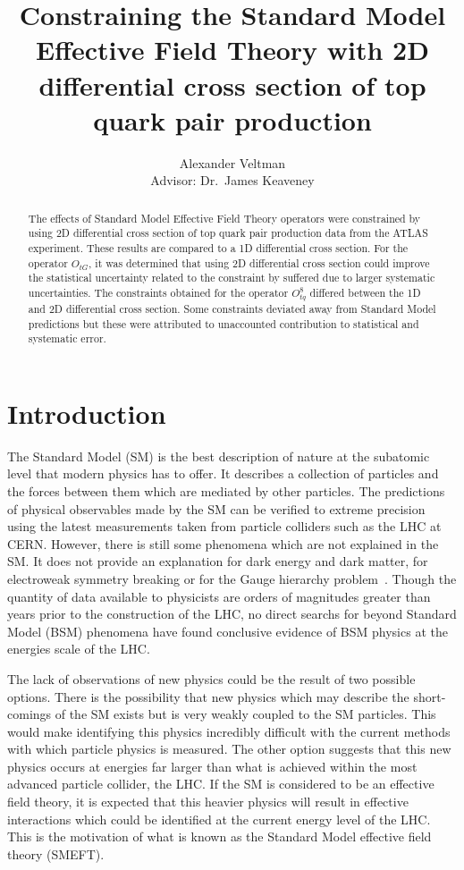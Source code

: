 \documentclass[a4paper,11pt]{article}
\title{Constraining the Standard Model Effective Field Theory with 2D differential cross section of top quark pair production}
\author{Alexander Veltman\\{\small Advisor: Dr.\ James Keaveney}}
\affil{Department of Physics,\\University of Cape Town}
\begin{document}
\maketitle

\begin{abstract}
    The effects of Standard Model Effective Field Theory operators were constrained by using 2D differential cross section of top quark pair production data from the ATLAS experiment.
    These results are compared to a 1D differential cross section.
    For the operator $O_{tG}$, it was determined that using 2D differential cross section could improve the statistical uncertainty related to the constraint by suffered due to larger systematic uncertainties.
    The constraints obtained for the operator $O_{tq}^{8}$ differed between the 1D and 2D differential cross section.
    Some constraints deviated away from Standard Model predictions but these were attributed to unaccounted contribution to statistical and systematic error.
\end{abstract}
\newpage
\section{Introduction}

The Standard Model (SM) is the best description of nature at the subatomic level that modern physics has to offer.
It describes a collection of particles and the forces between them which are mediated by other particles.
The predictions of physical observables made by the SM can be verified to extreme precision using the latest measurements taken from particle colliders such as the LHC at CERN.
However, there is still some phenomena which are not explained in the SM.
It does not provide an explanation for dark energy and dark matter, for electroweak symmetry breaking or for the Gauge hierarchy problem~\cite{morrissey2012}.
Though the quantity of data available to physicists are orders of magnitudes greater than years prior to the construction of the LHC, no direct searchs for beyond Standard Model (BSM) phenomena have found conclusive evidence of BSM physics at the energies scale of the LHC.

The lack of observations of new physics could be the result of two possible options.
There is the possibility that new physics which may describe the short-comings of the SM exists but is very weakly coupled to the SM particles.
This would make identifying this physics incredibly difficult with the current methods with which particle physics is measured.
The other option suggests that this new physics occurs at energies far larger than what is achieved within the most advanced particle collider, the LHC.
If the SM is considered to be an effective field theory, it is expected that this heavier physics will result in effective interactions which could be identified at the current energy level of the LHC.
This is the motivation of what is known as the Standard Model effective field theory (SMEFT).
\end{document}
